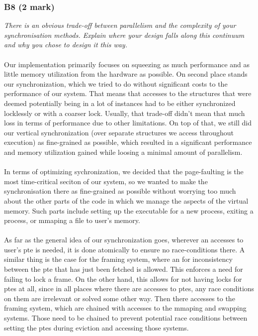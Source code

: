 \documentclass{report}
\newcommand{\question}[1]{\textit{#1} \ }
\begin{document}
			\subsubsection*{B8 (2 mark)}
				\question{There is an obvious trade-off between parallelism and the 
				complexity of your synchronisation methods. Explain where your design 
				falls along this continuum and why you chose to design it this way.}
				\\
				\\Our implementation primarily focuses on squeezing as much performance and
				as little memory utilization from the hardware as possible. On second place
				stands our synchronization, which we tried to do without significant costs
				to the performance of our system. That means that accesses to the structures
				that were deemed potentially being in a lot of instances had to be either
				synchronized locklessly or with a coarser lock. Usually, that trade-off didn't mean
				that much loss in terms of performance due to other limitations. On top of that,
				we still did our vertical synchronization (over separate structures we access
				throughout execution) as fine-grained as possible, which resulted in a significant
				performance and memory utilization gained while loosing a minimal amount of parallelism.
				\\
				\\In terms of optimizing sychronization, we decided that the page-faulting is the
				most time-critical seciton of our system, so we wanted to make the synchronisation
				there as fine-grained as possible without worrying too much about the other parts of the
				code in which we manage the aspects of the virtual memory. Such parts include setting up
				the executable for a new process, exiting a process, or mmaping a file to user's memory.
				\\
				\\ As far as the general idea of our synchronization goes, wherever an accesses to user's pte is needed,
				it is done atomically to ensure no race-conditions there. A similar thing is the case for the framing system,
				where an for inconsistency between the pte that has just been fetched is allowed. This enforces a need for
				failing to lock a frame. On the other hand, this allows for not having locks for ptes at all, since in all places
				where there are accesses to ptes, any race conditions on them are irrelevant or solved some other way. 
				Then there accesses to the framing system, which are chained with accesses to the mmaping and swapping systems.
				Those need to be chained to prevent potential race conditions between setting the ptes during eviction and accessing those systems.
				
\end{document}
